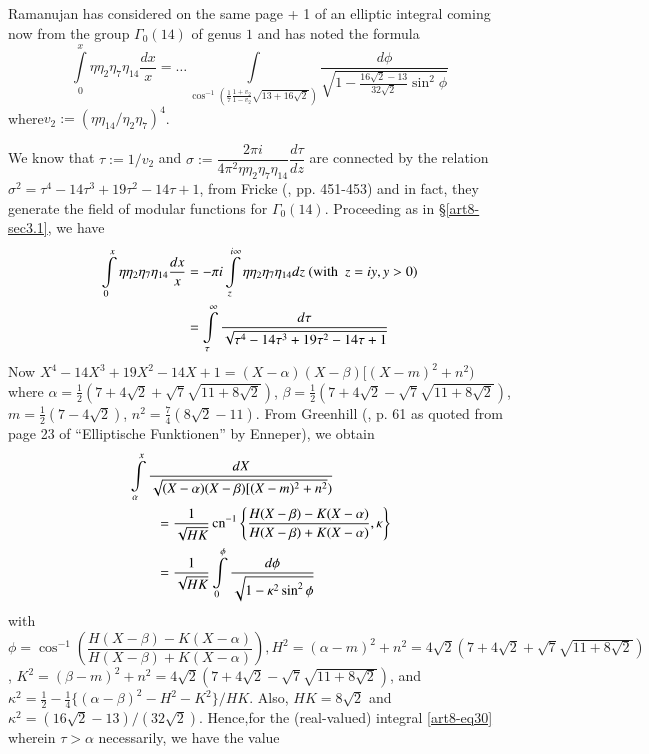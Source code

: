 \subsection{}\label{art8-sec3.2}
Ramanujan has considered on the same page  + 1 of \cite{art8-key11} an elliptic integral coming now from the group $\Gamma_{0}(14)$ of genus $1$ and has noted the formula
\begin{equation}
\int\limits^{x}_{0}\eta\eta_{2}\eta_{7}\eta_{14}\frac{dx}{x}=\ldots\int\limits_{\cos^{-1}\left(\frac{1}{7}\frac{1+v_{2}}{1-v_{2}}\sqrt{13+16\sqrt{2}}\right)}\frac{d\phi}{\sqrt{1-\frac{16\sqrt{2}-13}{32\sqrt{2}}\sin^{2}\phi}}\label{art8-eq29}
\end{equation}
where\pageoriginale $v_{2}:=(\eta\eta_{14}/\eta_{2}\eta_{7})^{4}$.

We know that $\tau:=1/v_{2}$ and $\sigma := \dfrac{2\pi i}{4\pi^{2}\eta\eta_{2}\eta_{7}\eta_{14}}\dfrac{d\tau}{dz}$ are connected by the relation $\sigma^{2}=\tau^{4}-14\tau^{3}+19\tau^{2}-14\tau+1$, from Fricke (\cite{art8-key3}, pp. 451-453) and in fact, they generate the field of modular functions for $\Gamma_{0}(14)$. Proceeding as in \S\ref{art8-sec3.1}, we have
\begin{align}
\int\limits^{x}_{0}\eta\eta_{2}\eta_{7}\eta_{14}\dfrac{dx}{x} &= -\pi i\int\limits^{i\infty}_{z}\eta\eta_{2}\eta_{7}\eta_{14}dz \ (\text{with~ } z=iy, y>0)\notag\\
&= \int\limits^{\infty}_{\tau}\dfrac{d\tau}{\sqrt{\tau^{4}-14\tau^{3}+19\tau^{2}-14\tau+1}}\label{art8-eq30}
\end{align}
Now $X^{4}-14X^{3}+19X^{2}-14X+1=(X-\alpha)(X-\beta)[(X-m)^{2}+n^{2})$ where $\alpha=\frac{1}{2}(7+4\sqrt{2}+\sqrt{7}\sqrt{11+8\sqrt{2}})$, $\beta=\frac{1}{2}(7+4\sqrt{2}-\sqrt{7}\sqrt{11+8\sqrt{2}})$, $m=\frac{1}{2}(7-4\sqrt{2})$, $n^{2}=\frac{7}{4}(8\sqrt{2}-11)$. From Greenhill (\cite{art8-key4}, p. 61 as quoted from page 23 of ``Elliptische Funktionen'' by Enneper), we obtain
\begin{align*}
& \int\limits^{x}_{\alpha}\frac{dX}{\sqrt{(X-\alpha)(X-\beta)[(X-m)^{2}+n^{2}})}\\
&\qquad =\frac{1}{\sqrt{HK}}\operatorname{cn}^{-1}\left\{\frac{H(X-\beta)-K(X-\alpha)}{H(X-\beta)+K(X-\alpha)},\kappa\right\}\\
&\qquad =\frac{1}{\sqrt{HK}}\int\limits^{\phi}_{0}\dfrac{d\phi}{\sqrt{1-\kappa^{2}\sin^{2}\phi}}
\end{align*}
with $\phi=\cos^{-1}\left(\dfrac{H(X-\beta)-K(X-\alpha)}{H(X-\beta)+K(X-\alpha)}\right),H^{2}=(\alpha-m)^{2}+n^{2}=4\sqrt{2}(7+4\sqrt{2}+\sqrt{7}\sqrt{11+8\sqrt{2}})$, $K^{2}=(\beta-m)^{2}+n^{2}=4\sqrt{2}(7+4\sqrt{2}-\sqrt{7}\sqrt{11+8\sqrt{2}})$, and $\kappa^{2}=\frac{1}{2}-\frac{1}{4}\{(\alpha-\beta)^{2}-H^{2}-K^{2}\}/HK$. Also, $HK=8\sqrt{2}$ and $\kappa^{2}=(16\sqrt{2}-13)/(32\sqrt{2})$. Hence,\pageoriginale for the (real-valued) integral \eqref{art8-eq30} wherein $\tau>\alpha$ necessarily, we have the value
